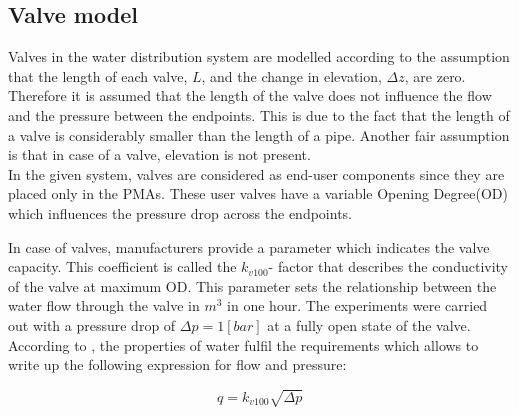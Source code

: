 \subsection{Valve model}  
\label{ValveModel}


Valves in the water distribution system are modelled according to the assumption that the length of each valve, $L$, and the change in elevation, $\Delta z$, are zero. Therefore it is assumed that the length of the valve does not influence the flow and the pressure between the endpoints. This is due to the fact that the length of a valve is considerably smaller than the length of a pipe. Another fair assumption is that in case of a valve, elevation is not present. \\
In the given system, valves are considered as end-user components since they are placed only in the PMAs. These user valves have a variable Opening Degree(OD) which influences the pressure drop across the endpoints. 

%


In case of valves, manufacturers provide a parameter which indicates the valve capacity. This coefficient is called the $k_{v100}$- factor that describes the conductivity of the valve at maximum OD. This parameter sets the relationship between the water flow through the valve in $m^{3}$ in one hour. The experiments were carried out with a pressure drop of $\Delta p = 1 [bar]$ at a fully open state of the valve. According to \cite{kvvalve}, the properties of water fulfil the requirements which allows to write up the following expression for flow and pressure: 

\begin{equation}
\label{kvequation}
 q =  k_{v100} \sqrt{\Delta p} 
\end{equation}

